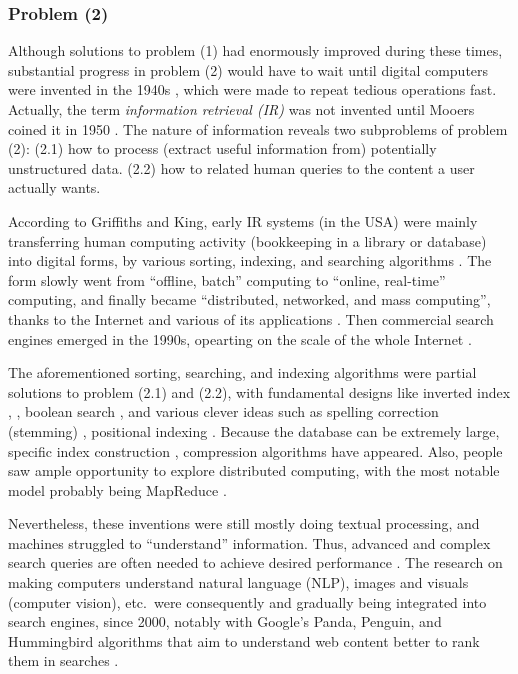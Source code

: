 \documentclass[final-report]{report-template}
\begin{document}
\subsubsection{Problem (2)}
Although solutions to problem (1) had enormously improved during these times,
substantial progress in problem (2) would have to wait until digital computers
were invented in the 1940s \cite{eniac.story}, which were made to repeat
tedious operations fast. Actually, the term \emph{information retrieval (IR)} was
not invented until Mooers coined it in 1950 \cite{mooers.info.ret.term}.  The
nature of information reveals two subproblems of problem (2): (2.1) how to
process (extract useful information from) potentially unstructured data. (2.2)
how to related human queries to the content a user actually wants.

According to Griffiths and King, early IR systems (in the USA) were mainly
transferring human computing activity (bookkeeping in a library or database)
into digital forms, by various sorting, indexing, and searching algorithms
\cite{early.info.systems}. The form slowly went from ``offline, batch''
computing to ``online, real-time'' computing, and finally became ``distributed,
networked, and mass computing'', thanks to the Internet and various of its
applications \cite{early.info.systems, history.internet}. Then commercial
search engines emerged in the 1990s, opearting on the scale of the whole
Internet \cite{history.search.engines, history.internet.search.engines}.

The aforementioned sorting, searching, and indexing algorithms were partial
solutions to problem (2.1) and (2.2), with fundamental designs like inverted
index \cite[chap.~2]{intro.info.ret}, \cite[sect.~2]{inverted.files.search},
boolean search \cite[chap.~1]{intro.info.ret}, and various clever ideas such as
spelling correction (stemming) \cite[chap.~3.3]{intro.info.ret}, positional
indexing \cite[sect.~3]{inverted.files.search}. Because the database can be
extremely large, specific index construction \cite[chap.~4]{intro.info.ret},
\cite[sect.~5]{inverted.files.search} compression
\cite[chap.~5]{intro.info.ret} algorithms have appeared. Also, people saw ample
opportunity to explore distributed computing, with the most notable model
probably being MapReduce \cite{mapreduce}.

Nevertheless, these inventions were still mostly doing textual processing, and
machines struggled to ``understand'' information. Thus, advanced and complex
search queries are often needed to achieve desired performance
\cite{advanced.search.necessity.1, advanced.search.necessity.2}. The research
on making computers understand natural language (NLP), images and visuals
(computer vision), etc.\ were consequently and gradually being integrated into
search engines, since 2000, notably with Google's Panda, Penguin, and
Hummingbird algorithms that aim to understand web content better to rank them
in searches \cite{google.new.algos}.
\end{document}
